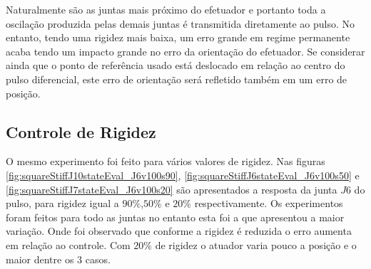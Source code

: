 Naturalmente são as juntas mais próximo do efetuador e portanto toda a oscilação produzida pelas demais juntas é transmitida diretamente ao pulso. No entanto, tendo uma rigidez mais baixa, um erro grande em regime permanente acaba tendo um impacto grande no erro da orientação do efetuador. Se considerar ainda que o ponto de referência usado está deslocado em relação ao centro do pulso diferencial, este erro de orientação será refletido também em um erro de posição.

%          

%          

\subsection{Controle de Rigidez}

O mesmo experimento foi feito para vários valores de rigidez. Nas figuras \ref{fig:squareStiffJ10stateEval_J6v100s90}, \ref{fig:squareStiffJ6stateEval_J6v100s50} e \ref{fig:squareStiffJ7stateEval_J6v100s20} são apresentados a resposta da junta $J6$ do pulso, para rigidez igual a $90\%$,$50\%$ e $20\%$ respectivamente. Os experimentos foram feitos para todo as juntas no entanto esta foi a que apresentou a maior variação. Onde foi observado que conforme a rigidez é reduzida o erro aumenta em relação ao controle. Com $20\%$ de rigidez o atuador varia pouco a posição e o maior dentre os 3 casos.


